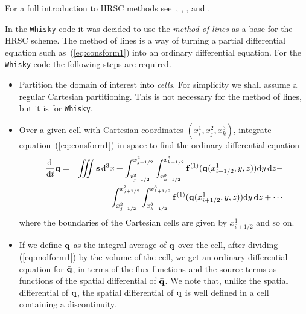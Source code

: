\documentclass{article}
\begin{document}
For a full introduction to HRSC methods see~\cite{laney}, \cite{toro},
\cite{leveque}, \cite{livrevsrrfd} and \cite{livrevgrrfd}.

In the {\tt Whisky} code it was decided to use the {\it method of lines} as a
base for the HRSC scheme. The method of lines is a way of turning a
partial differential equation such as~(\ref{eq:consform1}) into an
ordinary differential equation. For the {\tt Whisky} code the following steps
are required.
\begin{itemize}
\item Partition the domain of interest into {\it cells}. For
  simplicity we shall assume a regular Cartesian partitioning. This is
  not necessary for the method of lines, but it is for {\tt Whisky}.
\item Over a given cell with Cartesian coordinates $(x^1_i, x^2_j, x^3_k)$,
  integrate equation~(\ref{eq:consform1}) in space to find the
  ordinary differential equation
  \begin{eqnarray}
    \label{eq:molform1} \nonumber
    \frac{{\rm d} \,}{{\rm d} t} {\bf q} & = & \int \!\!\!\! \int \!\!\!\!
      \int {\bf s} \,{\rm d}^3 x + \int_{x^2_{j-1/2}}^{x^2_{j+1/2}}
    \int_{x^3_{k-1/2}}^{x^3_{k+1/2}} {\bf f}^{(1)} ({\bf q}
    (x^1_{i-1/2}, y, z)) {\rm d} y \, {\rm d} z - \\
    &&    \int_{x^2_{j-1/2}}^{x^2_{j+1/2}} 
    \int_{x^3_{k-1/2}}^{x^3_{k+1/2}} {\bf f}^{(1)} ({\bf q}
    (x^1_{i+1/2}, y, z))
    {\rm d} y \, {\rm d} z + \cdots
  \end{eqnarray}
  where the boundaries of the Cartesian cells are given by $x^1_{i \pm
  1/2}$ and so on.
\item If we define $\bar{\bf q}$ as the integral average of
  ${\bf q}$ over the cell, after dividing (\ref{eq:molform1}) by the volume of the cell, we get an ordinary
  differential equation for $\bar{\bf q}$, in terms of the flux functions and the
  source terms as functions of the spatial differential of $\bar{{\bf
  q}}$. We note that, unlike the spatial differential of ${\bf q}$,
  the spatial differential of $\bar{{\bf q}}$ is well defined in a
  cell containing a discontinuity. 
\end{itemize}
\end{document}
